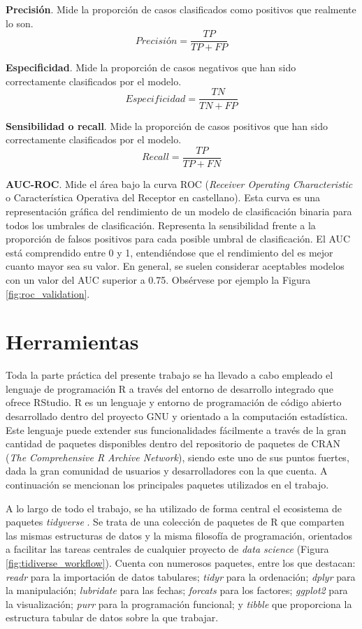 \documentclass[12pt,a4paper,]{book}
\numberwithin{dummy}{section}
\theoremstyle{ocrenumbox}
\theoremstyle{blacknumex}
\theoremstyle{blacknumbox}
\theoremstyle{ocrenum}
\theoremstyle{ocrenum}
\begin{document}
\textbf{Precisión}. Mide la proporción de casos clasificados como
positivos que realmente lo son. \[ Precisión = \frac{TP}{TP + FP}\]

\textbf{Especificidad}. Mide la proporción de casos negativos que han
sido correctamente clasificados por el modelo.
\[ Especificidad = \frac{TN}{TN + FP}\]

\textbf{Sensibilidad o recall}. Mide la proporción de casos positivos
que han sido correctamente clasificados por el modelo.
\[ Recall = \frac{TP}{TP + FN}\]

\textbf{AUC-ROC}. Mide el área bajo la curva ROC (\emph{Receiver
Operating Characteristic} o Característica Operativa del Receptor en
castellano). Esta curva es una representación gráfica del rendimiento de
un modelo de clasificación binaria para todos los umbrales de
clasificación. Representa la sensibilidad frente a la proporción de
falsos positivos para cada posible umbral de clasificación. El AUC está
comprendido entre 0 y 1, entendiéndose que el rendimiento del es mejor
cuanto mayor sea su valor. En general, se suelen considerar aceptables
modelos con un valor del AUC superior a 0.75. Obsérvese por ejemplo la
Figura \ref{fig:roc_validation}.

\hypertarget{herramientas}{%
\section{Herramientas}\label{herramientas}}

Toda la parte práctica del presente trabajo se ha llevado a cabo
empleado el lenguaje de programación R \citep{Rproject} a través del
entorno de desarrollo integrado que ofrece RStudio. R es un lenguaje y
entorno de programación de código abierto desarrollado dentro del
proyecto GNU y orientado a la computación estadística. Este lenguaje
puede extender sus funcionalidades fácilmente a través de la gran
cantidad de paquetes disponibles dentro del repositorio de paquetes de
CRAN (\emph{The Comprehensive R Archive Network}), siendo este uno de
sus puntos fuertes, dada la gran comunidad de usuarios y desarrolladores
con la que cuenta. A continuación se mencionan los principales paquetes
utilizados en el trabajo.

A lo largo de todo el trabajo, se ha utilizado de forma central el
ecosistema de paquetes \emph{tidyverse} \citep{tidyversepackage}. Se
trata de una colección de paquetes de R que comparten las mismas
estructuras de datos y la misma filosofía de programación, orientados a
facilitar las tareas centrales de cualquier proyecto de \emph{data
science} (Figura \ref{fig:tidiverse_workflow}). Cuenta con numerosos
paquetes, entre los que destacan: \emph{readr} para la importación de
datos tabulares; \emph{tidyr} para la ordenación; \emph{dplyr} para la
manipulación; \emph{lubridate} para las fechas; \emph{forcats} para los
factores; \emph{ggplot2} para la visualización; \emph{purr} para la
programación funcional; y \emph{tibble} que proporciona la estructura
tabular de datos sobre la que trabajar.
\end{document}
